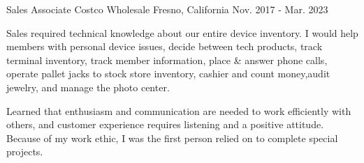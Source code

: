 \begin{cventries}
  \cventry
    {Sales Associate} %
    {Costco Wholesale} %
    {Fresno, California} %
    {Nov. 2017 - Mar. 2023} %
    {
      \begin{cvitems} %
	  \item {Sales required technical knowledge about our entire device inventory. I would help members with personal device issues, decide between tech products, track terminal inventory, track member information, place \& answer phone calls, operate pallet jacks to stock store inventory, cashier and count money,audit jewelry, and manage the photo center.}
		  \item {Learned that enthusiasm and communication are needed to work efficiently with others, and customer experience requires listening and a positive attitude. Because of my work ethic, I was the first person relied on to complete special projects.} 
	  \end{cvitems}
	 }
\end{cventries}
